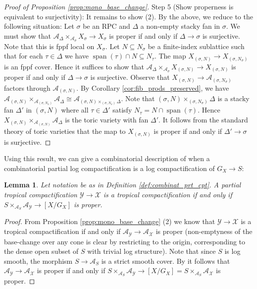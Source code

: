 \documentclass[11pt]{amsart}
\newtheorem{lemma}[theorem]{Lemma}
\theoremstyle{definition}
\theoremstyle{remark}
\DeclareMathOperator{\Span}{span}
\begin{document}
\begin{proof}[Proof of Proposition \ref{prop:mono_base_change}]
	Step 5 (Show properness is equivalent to surjectivity): It remains to show (2). By the above, we reduce to the following situation: Let $\sigma$ be an RPC and $\Delta$ a non-empty stacky fan in $\sigma$.
	We must show that $\mathcal{A}_{\Delta}\times_{\mathcal{A}_{\sigma}}X_{\sigma}\to X_{\sigma}$ is proper if and only if
	$\Delta\to \sigma$ is surjective. Note that this is fppf local on $X_{\sigma}$. Let $N\subseteq N_{\sigma}$ be a finite-index sublattice
	such that for each $\tau\in \Delta$ we have $\Span(\tau)\cap N\subseteq N_{\tau}$. The map $X_{(\sigma,N)}\to X_{(\sigma,N_{\sigma})}$
	is an fppf cover. Hence it suffices to show that $\mathcal{A}_{\Delta}\times_{\mathcal{A}_{\sigma}}X_{(\sigma,N)}\to X_{(\sigma,N)}$
	is proper if and only if $\Delta\to \sigma$ is surjective. Observe that $X_{(\sigma,N)}\to \mathcal{A}_{(\sigma,N_{\sigma})}$ factors through
	$\mathcal{A}_{(\sigma,N)}$. By Corollary \ref{cor:fib_prods_preserved}, we have
	$\mathcal{A}_{(\sigma,N)}\times_{\mathcal{A}_{(\sigma,N_{\sigma})}}\mathcal{A}_{\Delta}\cong \mathcal{A}_{(\sigma,N)\times_{(\sigma,N_{\sigma})}\Delta}$.
	Note that $(\sigma,N)\times_{(\sigma,N_{\sigma})}\Delta$ is a stacky fan $\Delta'$ in $(\sigma,N)$ where all $\tau\in \Delta'$
	satisfy $N_{\tau}=N\cap \Span(\tau)$. Hence $X_{(\sigma,N)}\times_{\mathcal{A}_{(\sigma,N)}}\mathcal{A}_{\Delta}$ is the toric
	variety with fan $\Delta'$. It follows from the standard theory of toric varieties that the map to $X_{(\sigma,N)}$ is proper if and
	only if $\Delta'\to \sigma$ is surjective.
\end{proof}

Using this result, we can give a combinatorial description of when a
combinatorial partial log compactification is a log compactification of $G_X\to S$:

\begin{lemma}
	\label{lem:proper_iff_surj}
	Let notation be as in Definition \ref{def:combinat_prt_cpt}.
	A partial tropical compactification $\mathcal{Y}\to \mathcal{X}$ is a tropical compactification if
	and only if $S\times_{\mathcal{A}_{S}}\mathcal{A}_{\mathcal{Y}}\to [X/G_X]$ is proper.
\end{lemma}

\begin{proof}
	From Proposition \ref{prop:mono_base_change} (2) we know that $\mathcal{Y}\to \mathcal{X}$ is a tropical compactification if and only
	if $\mathcal{A}_{\mathcal{Y}}\to \mathcal{A}_{\mathcal{X}}$ is proper (non-emptyness of the base-change over any cone is clear by restricting to the origin, corresponding to the dense open subset of $S$ with trivial log structure). Note that since $S$ is log smooth, the morphism
	$S\to \mathcal{A}_S$ is a strict smooth cover. By \cite[Tag 02L1]{stacks-project} it follows that $\mathcal{A}_{\mathcal{Y}}\to \mathcal{A}_{\mathcal{X}}$
	is proper if and only if $S\times_{\mathcal{A}_S}\mathcal{A}_{\mathcal{Y}}\to [X/G_X]=S\times_{\mathcal{A}_S}\mathcal{A}_{\mathcal{X}}$
	is proper.
\end{proof}
\end{document}
